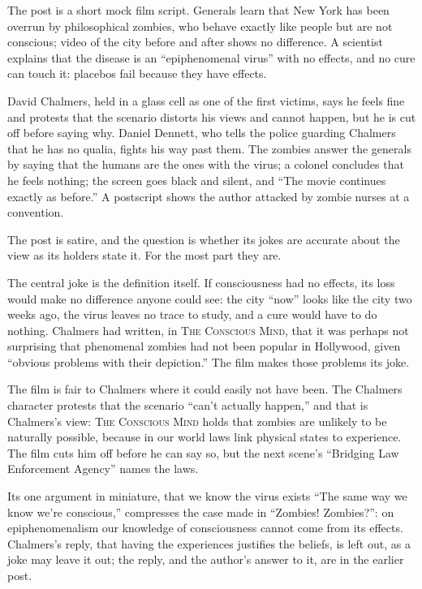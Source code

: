 \begin{afterword}
\summaryhead

The post is a short mock film script. Generals learn that New York has been overrun by philosophical zombies, who behave exactly like people but are not conscious; video of the city before and after shows no difference. A scientist explains that the disease is an ``epiphenomenal virus'' with no effects, and no cure can touch it: placebos fail because they have effects.

David Chalmers, held in a glass cell as one of the first victims, says he feels fine and protests that the scenario distorts his views and cannot happen, but he is cut off before saying why. Daniel Dennett, who tells the police guarding Chalmers that he has no qualia, fights his way past them. The zombies answer the generals by saying that the humans are the ones with the virus; a colonel concludes that he feels nothing; the screen goes black and silent, and ``The movie continues exactly as before.'' A postscript shows the author attacked by zombie nurses at a convention.

\responsehead

The post is satire, and the question is whether its jokes are accurate about the view as its holders state it. For the most part they are.

The central joke is the definition itself. If consciousness had no effects, its loss would make no difference anyone could see: the city ``now'' looks like the city two weeks ago, the virus leaves no trace to study, and a cure would have to do nothing. Chalmers had written, in \textsc{The Conscious Mind}, that it was perhaps not surprising that phenomenal zombies had not been popular in Hollywood, given ``obvious problems with their depiction.'' The film makes those problems its joke.

The film is fair to Chalmers where it could easily not have been. The Chalmers character protests that the scenario ``can't actually happen,'' and that is Chalmers's view: \textsc{The Conscious Mind} holds that zombies are unlikely to be naturally possible, because in our world laws link physical states to experience. The film cuts him off before he can say so, but the next scene's ``Bridging Law Enforcement Agency'' names the laws.

Its one argument in miniature, that we know the virus exists ``The same way we know we're conscious,'' compresses the case made in ``Zombies! Zombies?'': on epiphenomenalism our knowledge of consciousness cannot come from its effects. Chalmers's reply, that having the experiences justifies the beliefs, is left out, as a joke may leave it out; the reply, and the author's answer to it, are in the earlier post.


\end{afterword}
